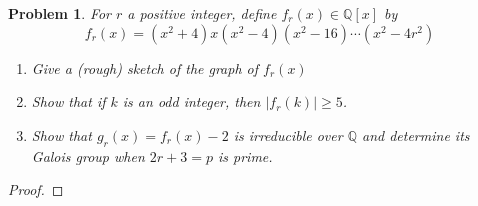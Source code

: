\documentclass[10pt]{article}
\newcommand{\bb}[1]{\mathbb{#1}}
\theoremstyle{plain}
\newtheorem{problem}{Problem}
\theoremstyle{remark}
\begin{document}
\begin{problem}
  For $r$ a positive integer, define $f_r(x)\in\bb{Q}[x]$ by
  \[
    f_r(x)=(x^2+4)x(x^2-4)(x^2-16)\cdots(x^2-4r^2)
  \]
  \begin{enumerate}
  \item[(a)] Give a (rough) sketch of the graph of $f_r(x)$
  \item[(b)] Show that if $k$ is an odd integer, then $|f_r(k)|\geq 5$.
  \item[(c)] Show that $g_r(x)=f_r(x)-2$ is irreducible over $\bb{Q}$ and
    determine its Galois group when $2r+3=p$ is prime.
  \end{enumerate}
\end{problem}

\begin{proof}
  
\end{proof}

\end{document}
